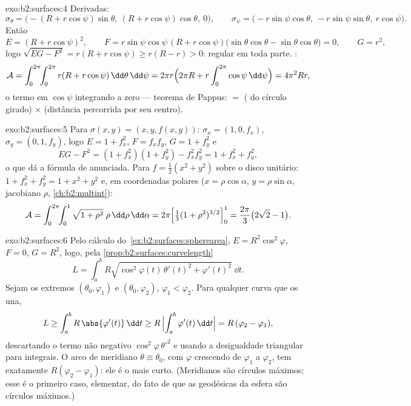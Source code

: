 \begin{solution}{exo:b2:surfaces:4}
Derivadas:
\[
\sigma_\theta = \bigl(-(R + r\cos\psi)\sin\theta,\
(R + r\cos\psi)\cos\theta,\ 0\bigr),
\qquad
\sigma_\psi = \bigl(-r\sin\psi\cos\theta,\
-r\sin\psi\sin\theta,\ r\cos\psi\bigr).
\]
Então
\[
E = (R + r\cos\psi)^2,
\qquad
F = r\sin\psi\cos\psi\,(R + r\cos\psi)
\bigl(\sin\theta\cos\theta - \sin\theta\cos\theta\bigr) = 0,
\qquad
G = r^2 ,
\]
logo $\sqrt{EG - F^2} = r(R + r\cos\psi) \geq r(R - r) > 0$:
regular em toda parte. :
\[
\mathcal{A}
= \int_0^{2\pi}\!\!\int_0^{2\pi} r(R + r\cos\psi)
\,\dd\theta\,\dd\psi
= 2\pi r \Bigl(2\pi R + r\int_0^{2\pi}\cos\psi\,\dd\psi\Bigr)
= 4\pi^2 R r ,
\]
o termo em $\cos\psi$ integrando a zero --- teorema de Pappus: 
$=$ ( do círculo girado) $\times$ (distância percorrida
por seu centro).
\end{solution}

\begin{solution}{exo:b2:surfaces:5}
Para $\sigma(x, y) = (x, y, f(x,y))$: $\sigma_x = (1, 0, f_x)$,
$\sigma_y = (0, 1, f_y)$, logo $E = 1 + f_x^2$, $F = f_xf_y$, $G = 1
+ f_y^2$ e
\[
EG - F^2 = (1 + f_x^2)(1 + f_y^2) - f_x^2f_y^2
= 1 + f_x^2 + f_y^2 ,
\]
o que dá a fórmula de  anunciada. Para $f = \frac12(x^2 + y^2)$ sobre
o disco unitário: $1 + f_x^2 + f_y^2 = 1 + x^2 + y^2$ e, em coordenadas
polares ($x = \rho\cos\alpha$, $y = \rho\sin\alpha$, jacobiano
$\rho$, \cref{ch:b2:multint}):
\[
\mathcal{A}
= \int_0^{2\pi}\!\!\int_0^1 \sqrt{1 + \rho^2}\;\rho
\,\dd\rho\,\dd\alpha
= 2\pi\Bigl[\tfrac13(1 + \rho^2)^{3/2}\Bigr]_0^1
= \frac{2\pi}{3}\bigl(2\sqrt2 - 1\bigr).
\]
\end{solution}

\begin{solution}{exo:b2:surfaces:6}
Pelo cálculo do~\cref{ex:b2:surfaces:spherearea}, $E =
R^2\cos^2\varphi$, $F = 0$, $G = R^2$, logo, pela
\cref{prop:b2:surfaces:curvelength}
\[
L = \int_a^b R\sqrt{\cos^2\varphi(t)\,\theta'(t)^2
+ \varphi'(t)^2}\;\dd t .
\]
Sejam os extremos $(\theta_0, \varphi_1)$ e $(\theta_0,
\varphi_2)$, $\varphi_1 < \varphi_2$. Para qualquer curva que os una,
\[
L \geq \int_a^b R\,\abs{\varphi'(t)}\,\dd t
\geq R\,\Bigl|\int_a^b \varphi'(t)\,\dd t\Bigr|
= R\,(\varphi_2 - \varphi_1),
\]
descartando o termo não negativo $\cos^2\varphi\,\theta'^2$ e usando
a desigualdade triangular para integrais. O arco de meridiano
$\theta \equiv \theta_0$, com $\varphi$ crescendo de $\varphi_1$ a
$\varphi_2$, tem \omterm{def:b2:curves:length}{comprimento} exatamente $R(\varphi_2 - \varphi_1)$: ele é o
mais curto. (Meridianos são círculos máximos; esse é o primeiro
caso, elementar, do fato de que as geodésicas da esfera são círculos
máximos.)
\end{solution}

